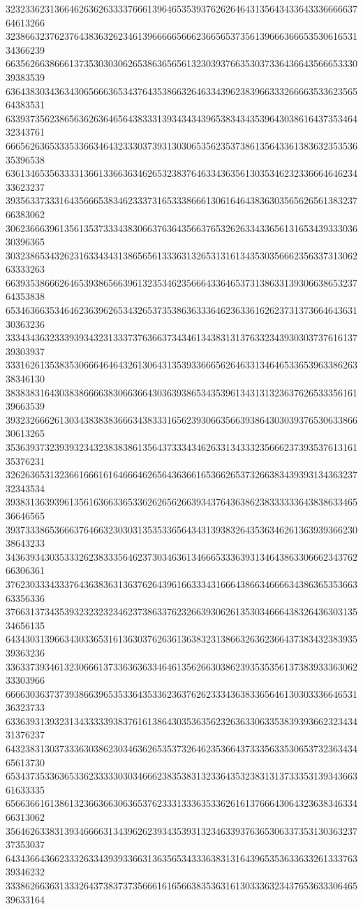 32323362313664626362633337666139646535393762626464313564343364333666663764613266
32386632376237643836326234613966666566623665653735613966636665353061653134366239
66356266386661373530303062653863656561323039376635303733643664356665333039383539
63643830343634306566636534376435386632646334396238396633326666353362356564383531
63393735623865636263646564383331393434343965383434353964303861643735346432343761
66656263653335336634643233303739313030653562353738613564336138363235353635396538
63613465356333313661336636346265323837646334363561303534623233666464623433623237
39356337333164356665383462333731653338666130616464383630356562656138323766383062
30623666396135613537333438306637636435663765326263343365613165343933303630396365
30323865343262316334343138656561333631326531316134353035666235633731306263333263
66393538666264653938656639613235346235666433646537313863313930663865323764353838
65346366353464623639626534326537353863633364623633616262373137366464363130363236
33343436323339393432313337376366373434613438313137633234393030373761613739303937
33316261353835306664646432613064313539336665626463313464653365396338626338346130
38383831643038386666383066366430363938653435396134313132363762653335616139663539
39323266626130343838383666343833316562393066356639386430303937653063386630613265
35363937323939323432383838613564373334346263313433323566623739353761316135376231
32626365313236616661616466646265643636616536626537326638343939313436323732343534
39383136393961356163663365336262656266393437643638623833333364383863346536646565
39373338653666376466323030313535336564343139383264353634626136393936623038643233
34363934303533326238333564623730346361346665333639313464386330666234376266306361
37623033343337643638363136376264396166333431666438663466663438636535366363356336
37663137343539323232323462373863376232663930626135303466643832643630313534656135
64343031396634303365316136303762636136383231386632636236643738343238393539363236
33633739346132306661373363636334646135626630386239353535613738393336306233303966
66663036373739386639653533643533623637626233343638336564613030333664653136323733
63363931393231343333393837616138643035363562326363306335383939366232343431376237
64323831303733363038623034636265353732646235366437333563353065373236343465613730
65343735336365336233333030346662383538313233643532383131373335313934366361633335
65663661613861323663663063653762333133363533626161376664306432363834633466313062
35646263383139346666313439626239343539313234633937636530633735313036323737353037
64343664366233326334393933663136356534333638313164396535363363326133376339346232
33386266363133326437383737356661616566383536316130333632343765363330646539633164
